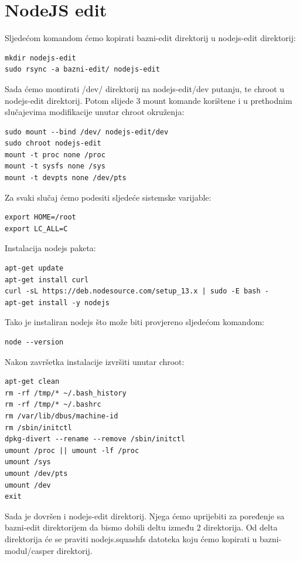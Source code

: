 \documentclass[12pt,vi]{mitthesis}
\begin{document}
\section*{NodeJS edit}

\indent
Sljedećom komandom ćemo kopirati bazni-edit direktorij u nodejs-edit direktorij:
\begin{lstlisting}[style=BashInputStyle]
mkdir nodejs-edit
sudo rsync -a bazni-edit/ nodejs-edit
\end{lstlisting}

Sada ćemo montirati /dev/ direktorij na nodejs-edit/dev putanju, te chroot u nodejs-edit direktorij. Potom slijede 3 mount komande korištene i u prethodnim slučajevima modifikacije unutar chroot okruženja:
\begin{lstlisting}[style=BashInputStyle]
sudo mount --bind /dev/ nodejs-edit/dev
sudo chroot nodejs-edit
mount -t proc none /proc
mount -t sysfs none /sys
mount -t devpts none /dev/pts
\end{lstlisting}

Za svaki slučaj ćemo podesiti sljedeće sistemske varijable:
\begin{lstlisting}[style=BashInputStyle]
export HOME=/root
export LC_ALL=C
\end{lstlisting}

Instalacija nodejs paketa:
\begin{lstlisting}[style=BashInputStyle]
apt-get update
apt-get install curl
curl -sL https://deb.nodesource.com/setup_13.x | sudo -E bash -
apt-get install -y nodejs
\end{lstlisting}

Tako je instaliran nodejs što može biti provjereno sljedećom komandom:
\begin{lstlisting}[style=BashInputStyle]
node --version
\end{lstlisting}

\noindent
Nakon završetka instalacije izvršiti unutar chroot:
\begin{lstlisting}[style=BashInputStyle]
apt-get clean
rm -rf /tmp/* ~/.bash_history
rm -rf /tmp/* ~/.bashrc
rm /var/lib/dbus/machine-id
rm /sbin/initctl
dpkg-divert --rename --remove /sbin/initctl
umount /proc || umount -lf /proc
umount /sys
umount /dev/pts
umount /dev
exit
\end{lstlisting}

Sada je dovršen i nodejs-edit direktorij. Njega ćemo uprijebiti za poređenje sa bazni-edit direktorijem da bismo dobili deltu između 2 direktorija. Od delta direktorija će se praviti nodejs.squashfs datoteka koju ćemo kopirati u bazni-modul/casper direktorij.
\end{document}
